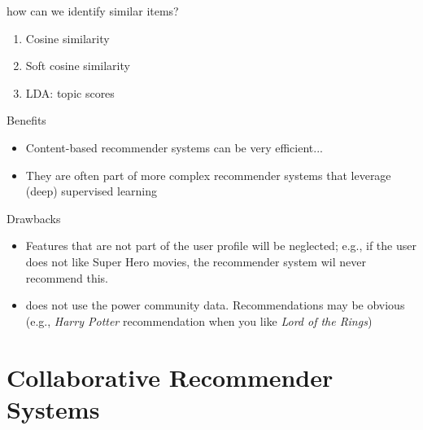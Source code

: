 \begin{frame}  
	\begin{block}{how can we identify similar items?}
		\begin{enumerate}
			\item<1->Cosine similarity
			\item<2->Soft cosine similarity
			\item<3-> LDA: topic scores
		\end{enumerate}
	\end{block}
\end{frame}

\begin{frame}
	\begin{exampleblock}{Benefits}
		\begin{itemize}
			\item <1-> Content-based recommender systems can be very efficient...
			\item <2->They are often part of more complex recommender systems that leverage (deep) supervised learning
		\end{itemize}
	\end{exampleblock}
	\begin{alertblock}{Drawbacks}
		\begin{itemize}
			\item <3->Features that are not part of the user profile will be neglected; e.g., if the user does not like Super Hero movies, the recommender system wil never recommend this. 
			\item <4->does not use the power community data. Recommendations may be obvious (e.g., \textit{Harry Potter} recommendation when you like \textit{Lord of the Rings})
		\end{itemize}
	\end{alertblock}
\end{frame}

\section[Collaborative RecSys]{Collaborative Recommender Systems}

